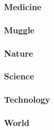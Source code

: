 \subsubsection{Medicine}

\subsubsection{Muggle}

\subsubsection{Nature}

\subsubsection{Science}

\subsubsection{Technology}

\subsubsection{World}
